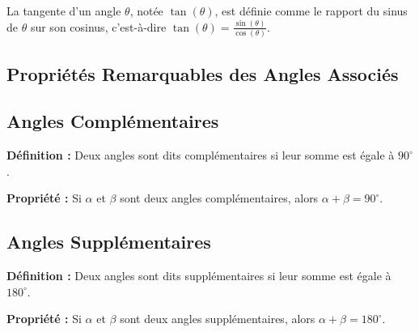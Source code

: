 \documentclass{report}
\begin{document}
      La tangente d'un angle $\theta$, notée $\tan(\theta)$, est définie comme le rapport du sinus de $\theta$ sur son cosinus, c'est-à-dire $\tan(\theta) = \frac{\sin(\theta)}{\cos(\theta)}$.

      \subsection{Propriétés Remarquables des Angles Associés}

      \subsection{Angles Complémentaires}

      \textbf{Définition :} Deux angles sont dits complémentaires si leur somme est égale à $90^\circ$.

      \begin{center}
      \end{center}

      \textbf{Propriété :} Si $\alpha$ et $\beta$ sont deux angles complémentaires, alors $\alpha + \beta = 90^\circ$.

      \subsection{Angles Supplémentaires}

      \textbf{Définition :} Deux angles sont dits supplémentaires si leur somme est égale à $180^\circ$.

      \begin{center}
      \end{center}

      \textbf{Propriété :} Si $\alpha$ et $\beta$ sont deux angles supplémentaires, alors $\alpha + \beta = 180^\circ$.
\end{document}
